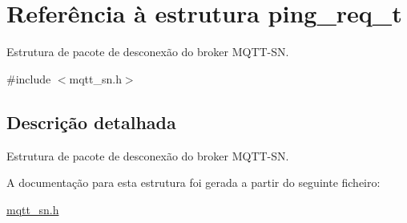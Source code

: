 \hypertarget{structping__req__t}{\section{Referência à estrutura ping\+\_\+req\+\_\+t}
\label{structping__req__t}
}


Estrutura de pacote de desconexão do broker M\+Q\+T\+T-\/\+S\+N.  




{\ttfamily \#include $<$mqtt\+\_\+sn.\+h$>$}



\subsection{Descrição detalhada}
Estrutura de pacote de desconexão do broker M\+Q\+T\+T-\/\+S\+N. 

A documentação para esta estrutura foi gerada a partir do seguinte ficheiro\+:\begin{DoxyCompactItemize}
\item 
\hyperlink{mqtt__sn_8h}{mqtt\+\_\+sn.\+h}\end{DoxyCompactItemize}
